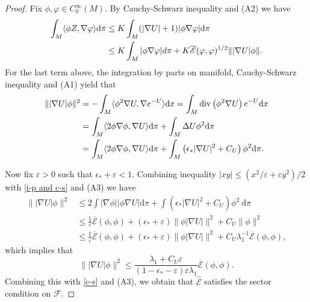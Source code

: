 \documentclass[12pt,reqno]{article}
\theoremstyle{definition}
\theoremstyle{remark}
\theoremstyle{example}
\numberwithin{equation}{section}
\newcommand{\scr}[1]{\mathscr #1}
\def\d{\mathrm{d}}
\def\e{\scr E}
\def\d{\rm d}
\def\lb{\label}
\def\lan{\langle}\def\ran{\rangle}
\def\bar{\overline}
\def\d{{\mbox{\rm d}}}
\begin{document}
{\begin{proof}
Fix $\phi,\varphi\in C^\infty_0(M)$. By	Cauchy-Schwarz inequality and (A2) we have
\begin{equation}\lb{c-s}
	\begin{split}
		\int_M\lan\phi Z,\nabla \varphi\ran \d \pi&\leq K\int_M (|\nabla U|+1)|\phi\nabla \varphi|\d \pi\\
		&\leq K\int_M |\phi\nabla \varphi|d \pi+K\bar{\e}(\varphi,\varphi)^{1/2}	\||\nabla U| \phi\|	.
	\end{split}
\end{equation}
For the last term above, the integration by parts on manifold, Cauchy-Schwarz inequality and (A1)  yield that
\begin{equation}\label{i-p and c-s}
\begin{aligned}
	\||\nabla U| \phi\|^2 &=-\int_M \lan\phi^{2} \nabla U , \nabla e^{-U}\ran \d x
	=\int_M \operatorname{div}\left(\phi^{2} \nabla U\right) e^{-U} \d x \\
	&=\int_M \lan2 \phi \nabla \phi , \nabla U\ran \d \pi+\int_M \Delta U \phi^{2} \d \pi\\
&=\int_M \lan2 \phi \nabla \phi , \nabla U\ran \d \pi+\int_M\left(\epsilon_* |\nabla U|^{2}+C_U\right) \phi^{2} \d \pi.
\end{aligned}
\end{equation}

Now fix $\varepsilon>0$ such that $\epsilon_*+\varepsilon<1$. Combining inequality $|x y| \leq\left(x^{2} / \varepsilon+\varepsilon y^{2}\right) / 2$ with \eqref{i-p and c-s} and (A3) we have
$$
\begin{aligned}
		\||\nabla U| \phi\|^2 &\leq 2 \int |\nabla \phi||\phi\nabla U| \mathrm{d} \pi+\int\left(\epsilon_* |\nabla U|^{2}+C_U\right) \phi^{2} \mathrm{~d} \pi \\
	&\leq \frac{1}{\varepsilon}\bar{\e}(\phi,\phi)+(\epsilon_*+\varepsilon)\|\phi|\nabla U|\|^{2}+C_U\|\phi\|^{2}\\
	&\leq \frac{1}{\varepsilon}\bar{\e}(\phi,\phi)+(\epsilon_*+\varepsilon)\|\phi|\nabla U|\|^2+C_U\lambda_1^{-1}\bar{\e}(\phi,\phi),
\end{aligned}
$$
which implies that
$$
\||\nabla U| \phi\|^2\leq\frac{\lambda_1+C_U\varepsilon}{(1-\epsilon_*-\varepsilon)\varepsilon\lambda_1}\bar{\e}(\phi,\phi).
$$
Combining this with \eqref{c-s} and (A3), we obtain that $\widehat{\e}$ satisfies the sector condition on $\scr{F}$.%
\end{proof}

}
\end{document}

